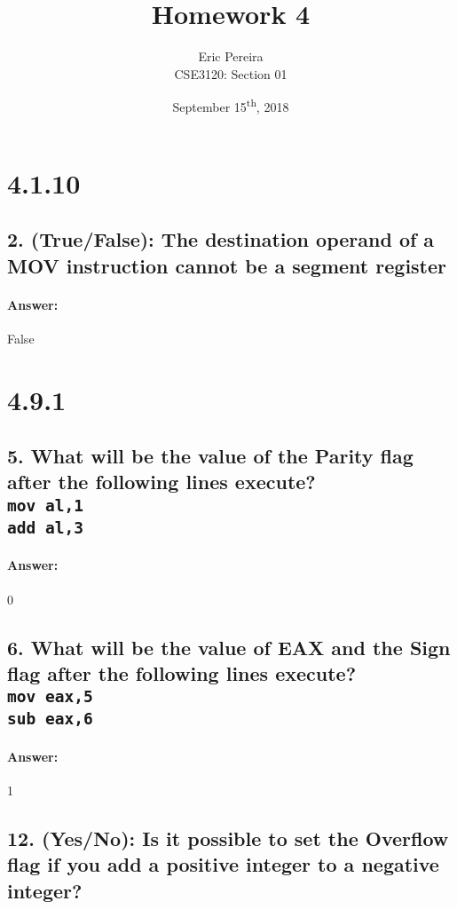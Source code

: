 \documentclass[12pt]{article}
\begin{document}
\author{Eric Pereira\\
	CSE3120: Section 01}
\date{September 15\textsuperscript{th}, 2018}
\title{Homework 4}
\maketitle

\section*{4.1.10}

\subsection*{2. \normalsize (True/False): The destination operand of a MOV instruction cannot be a segment register}
\paragraph{Answer: }False

\section*{4.9.1}

\subsection*{5. \normalsize What will be the value of the Parity flag after the following lines execute?\\
\texttt{mov al,1} \\
\texttt{add al,3}}
\paragraph{Answer: }0

\subsection*{6. \normalsize What will be the value of EAX and the Sign flag after the following lines execute? \\
\texttt{mov eax,5} \\
\texttt{sub eax,6}}
\paragraph{Answer: }1

\subsection*{12. \normalsize (Yes/No): Is it possible to set the Overflow flag if you add a positive integer to a negative integer?}
\end{document}

